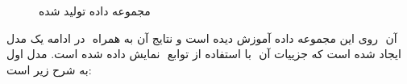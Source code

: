 \documentclass{article}
\begin{document}
\begin{figure}[h] 
	\centering
	\caption{مجموعه داده تولید شده}
	\label{fig: Q1 data}
\end{figure}

در ادامه یک مدل ‎‎‎ روی این مجموعه داده آموزش دیده است و نتایج آن به همراه 
‎ 
آن نمایش داده شده است. مدل اول ‎ با استفاده از توابع ‎ ایجاد شده است که جزییات آن به شرح زیر است:
	
\end{document}

